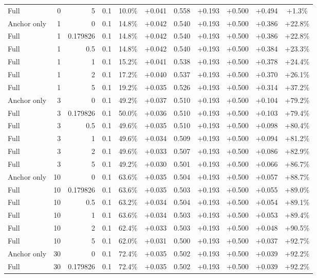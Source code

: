 \begin{table}[htbp]
\begin{tabular}{lrrrccccccc}
Full & 0 & 5 & 0.1 & 10.0\% & +0.041 & 0.558 & +0.193 & +0.500 & +0.494 & +1.3\% \\
Anchor only & 1 & 0 & 0.1 & 14.8\% & +0.042 & 0.540 & +0.193 & +0.500 & +0.386 & +22.8\% \\
Full & 1 & 0.179826 & 0.1 & 14.8\% & +0.042 & 0.540 & +0.193 & +0.500 & +0.386 & +22.8\% \\
Full & 1 & 0.5 & 0.1 & 14.8\% & +0.042 & 0.540 & +0.193 & +0.500 & +0.384 & +23.3\% \\
Full & 1 & 1 & 0.1 & 15.2\% & +0.041 & 0.538 & +0.193 & +0.500 & +0.378 & +24.4\% \\
Full & 1 & 2 & 0.1 & 17.2\% & +0.040 & 0.537 & +0.193 & +0.500 & +0.370 & +26.1\% \\
Full & 1 & 5 & 0.1 & 19.2\% & +0.035 & 0.526 & +0.193 & +0.500 & +0.314 & +37.2\% \\
Anchor only & 3 & 0 & 0.1 & 49.2\% & +0.037 & 0.510 & +0.193 & +0.500 & +0.104 & +79.2\% \\
Full & 3 & 0.179826 & 0.1 & 50.0\% & +0.036 & 0.510 & +0.193 & +0.500 & +0.103 & +79.4\% \\
Full & 3 & 0.5 & 0.1 & 49.6\% & +0.035 & 0.510 & +0.193 & +0.500 & +0.098 & +80.4\% \\
Full & 3 & 1 & 0.1 & 49.6\% & +0.034 & 0.509 & +0.193 & +0.500 & +0.094 & +81.2\% \\
Full & 3 & 2 & 0.1 & 49.6\% & +0.033 & 0.507 & +0.193 & +0.500 & +0.086 & +82.9\% \\
Full & 3 & 5 & 0.1 & 49.2\% & +0.030 & 0.501 & +0.193 & +0.500 & +0.066 & +86.7\% \\
Anchor only & 10 & 0 & 0.1 & 63.6\% & +0.035 & 0.504 & +0.193 & +0.500 & +0.057 & +88.7\% \\
Full & 10 & 0.179826 & 0.1 & 63.6\% & +0.035 & 0.503 & +0.193 & +0.500 & +0.055 & +89.0\% \\
Full & 10 & 0.5 & 0.1 & 63.2\% & +0.034 & 0.504 & +0.193 & +0.500 & +0.054 & +89.1\% \\
Full & 10 & 1 & 0.1 & 63.6\% & +0.034 & 0.503 & +0.193 & +0.500 & +0.053 & +89.4\% \\
Full & 10 & 2 & 0.1 & 62.4\% & +0.033 & 0.503 & +0.193 & +0.500 & +0.048 & +90.5\% \\
Full & 10 & 5 & 0.1 & 62.0\% & +0.031 & 0.500 & +0.193 & +0.500 & +0.037 & +92.7\% \\
Anchor only & 30 & 0 & 0.1 & 72.4\% & +0.035 & 0.502 & +0.193 & +0.500 & +0.039 & +92.2\% \\
Full & 30 & 0.179826 & 0.1 & 72.4\% & +0.035 & 0.502 & +0.193 & +0.500 & +0.039 & +92.2\% \\

\end{tabular}
\end{table}
